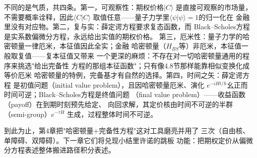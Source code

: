 不同的是气质，共四条。第一，可观察性：期权价格$\vert C\rangle$
是直接可观察的市场量，不需要概率诠释，因此$\langle C\vert C\rangle$
取值任意——量子力学里$\langle\psi\vert\psi\rangle=1$的归一化在
金融里没有对应物。第二，复与实：薛定谔方程要求复态函数，而
Black--Scholes方程是实系数偏微分方程，永远给出实值的期权价格。
第三，厄米性：量子力学的哈密顿量一律厄米，本征值因此全实；金融
哈密顿量（$H_{BS}$等）非厄米，本征值一般取复值——复本征值又带来
一个更深的麻烦：不存在对一切哈密顿量通用的程序来挑选"给出完备性
方程的那组本征函数"；只有像4.8节那样能靠相似变换化成等价厄米
哈密顿量的特例，完备基才有自然的选择。第四，时间之矢：薛定谔方程
是初值问题（initial value problem），且因哈密顿量厄米、演化
$e^{-iHt/\hbar}$幺正而时间可逆；Black--Scholes方程是终值问题
（final value problem）——收益函数（payoff）在到期时刻预先给定、
向回求解，其定价核由时间不可逆的半群（semi-group）$e^{-\tau H}$
生成，过程整体时间不可逆。

到此为止，第4章把"哈密顿量$+$完备性方程"这对工具磨亮并用了
三次（自由核、单障碍、双障碍）。下一章它们将兑现小结里许诺的跳板
功能：把期权定价从偏微分方程表述整体搬进路径积分表述。

